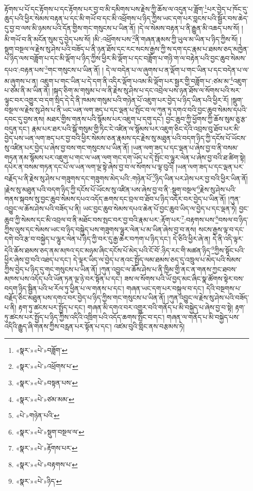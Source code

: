 རྟོགས་པ་པོ་དང་རྟོགས་པ་དང་རྟོགས་པར་བྱ་བ་མི་དམིགས་པས་རྗེས་ཀྱི་ཆོས་ལ་འདུན་པ་ཟློག་\footnote{«སྣར་»«པེ་»བཟློག་}པར་བྱེད་པ་ཁོང་དུ་ཆུད་པའི་ཕྱིར་སེམས་བརྟན་པ་དང་མི་གཡོ་བ་དང་མི་འཕྲོགས་པ་ཉིད་ཀྱིས་ཡང་དག་པར་བླངས་པའི་སྦྱོར་བས་ཆེད་དུ་བྱ་བ་ལས་མི་ཉམས་པའི་དོན་གྱིས་གང་གསུངས་པ་ཡིན་ནོ། །དེ་ལ་སེམས་བརྟན་པ་ནི་རྒྱུན་མི་འཆད་པས་སོ། །མི་གཡོ་བ་ནི་མངོན་སུམ་དུ་བྱེད་པས་སོ། །མི་:འཕྲོགས་པས་\footnote{«སྣར་»«པེ་»འཕྲོགས་པ་}ནི་གཞན་རྣམས་ཀྱི་ཡུལ་མ་ཡིན་པ་ཉིད་ཀྱིས་སོ། །སྡུག་བསྔལ་ལ་རྗེས་སུ་ཤེས་པའི་བཟོད་པ་ནི་ཉན་ཐོས་དང་རང་སངས་རྒྱས་ཀྱི་ས་དག་དང་རྣམ་པ་ཐམས་ཅད་མཁྱེན་པ་ཉིད་ལས་བཟློག་པ་དང་མི་ལྡོག་པ་ཉིད་ཀྱིས་ཕྱིར་མི་ལྡོག་པ་དང་བཟློག་པ་གཉི་ག་ལ་བརྟེན་པའི་བྱང་ཆུབ་སེམས་དཔའ་:བརྟན་པས་\footnote{«སྣར་»«པེ་»བསྟན་པས་}གང་གསུངས་པ་ཡིན་ནོ། །
དེ་ལ་བདེན་པ་ལ་ཞུགས་པ་ན་ལྡོག་པ་གང་ཡིན་པ་དང་བདེན་པ་ལ་མ་ཞུགས་པ་ན། འཇུག་པ་གང་ཡིན་པ་དེ་དག་ནི་འདིར་ལྡོག་པའམ་མི་ལྡོག་པར་སྦྱར་གྱི་བཟློག་པ་:ཙམ་མ་\footnote{«སྣར་»«པེ་»ཙམ་མམ་}འཇུག་པ་ཙམ་ནི་མ་ཡིན་ནོ། །སྐད་ཅིག་མ་གསུམ་པ་ལ་ནི་རྗེས་སུ་ཤེས་པ་དང་འབྲེལ་པས་ཉན་ཐོས་ལ་སོགས་པའི་སར་ལྟུང་བར་འགྱུར་བ་དག་སྲིད་དེ་དེ་ནི་ཁམས་གསུམ་པའི་གཉེན་པོ་འཇུག་པར་བྱེད་པ་ཉིད་ཡིན་པའི་ཕྱིར་རོ། །སྡུག་བསྔལ་ལ་རྗེས་སུ་ཤེས་པ་ནི་ཡང་ཡན་ལག་ཟད་པ་དང་ལྡན་པ་སྤོང་བ་ལ་ཀུན་ཏུ་དགའ་བའི་བྱང་ཆུབ་སེམས་དཔའི་དབང་དུ་བྱས་ནས། མཐར་གྱིས་གནས་པའི་སྙོམས་པར་འཇུག་པ་དགུ་དང་། བྱང་ཆུབ་ཀྱི་ཕྱོགས་ཀྱི་ཆོས་སུམ་ཅུ་རྩ་བདུན་དང་། རྣམ་པར་ཐར་པའི་སྒོ་གསུམ་གྱི་ཏིང་ངེ་འཛིན་ལ་སྙོམས་པར་འཇུག་ཅིང་དེའི་འབྲས་བུ་ཐོབ་པར་མི་བྱེད་པས་ཡན་ལག་ཟད་པར་བྱ་བའི་ཕྱིར་སེམས་ཅན་རྣམས་དང་རྗེས་སུ་མཐུན་པའི་བདག་ཉིད་ཀྱི་དངོས་པོ་ཡོངས་སུ་འཛིན་པར་བྱེད་པ་ཞེས་བྱ་བས་གང་གསུངས་པ་ཡིན་ནོ། །ཡན་ལག་ཟད་པ་དང་ལྡན་པ་ཞེས་བྱ་བ་ནི་བསམ་གཏན་ནམ་སྙོམས་པར་འཇུག་པ་གང་ལ་ཡན་ལག་གང་དག་ཡོད་པ་དེ་སྤོང་བ་ལྷུར་ལེན་པ་ཞེས་བྱ་བའི་ཐ་ཚིག་སྟེ། དཔེར་ན་བསམ་གཏན་དང་པོ་ལ་ཡན་ལག་ལྔ་སྟེ་ཞེས་བྱ་བ་ལ་སོགས་པ་ལྟ་བུའོ། །ཡན་ལག་ཟད་པ་དང་ལྡན་པར་བརྗོད་པ་ནི་རྗེས་སུ་ཤེས་པ་གཟུགས་དང་གཟུགས་མེད་པའི་:གཉེན་པོ་\footnote{«པེ་»གཉེན་པའི་}ཉིད་ཡིན་པར་ཤེས་པར་བྱ་བའི་ཕྱིར་ཡིན་ནོ། །རྗེས་སུ་མཐུན་པའི་བདག་ཉིད་ཀྱི་དངོས་པོ་ཡོངས་སུ་འཛིན་པས་ཞེས་བྱ་བ་ནི་:སྡུག་བསྔལ་\footnote{«སྣར་»«པེ་»སྡུག་བསྔལ་ལ་}རྗེས་སུ་ཤེས་པའི་གནས་སྐབས་སུ་བྱང་ཆུབ་སེམས་དཔའ་འདོད་ཆགས་དང་བྲལ་བ་ཐོབ་པ་ཉིད་འདོར་བར་བྱེད་པ་ཡིན་ནོ། །ཀུན་འབྱུང་ལ་ཆོས་ཤེས་པའི་བཟོད་པ་ནི། ཡང་བྱང་ཆུབ་སེམས་དཔའ་ཆེན་པོ་བྱང་ཆུབ་ཡིད་ལ་བྱེད་པ་དང་ལྡན་ཏེ། བྱང་ཆུབ་ཀྱི་སེམས་དང་མི་འབྲལ་བ་ནི་མཐོང་བས་སྤང་བར་བྱ་བའི་རྣམ་པར་:རྟོག་པར་\footnote{«སྣར་»«པེ་»རྟོགས་པར་}:བརྟགས་པས་\footnote{«སྣར་»«པེ་»བརྟགས་པ་}བསལ་བ་ཉིད་ཀྱིས་ལུས་དང་སེམས་ཡང་བ་ཉིད་བསྐྱེད་པས་གཟུགས་ལྷུར་ལེན་པ་མ་ཡིན་ཞེས་བྱ་བ་ནས། སངས་རྒྱས་ལྟ་བ་དང་དགེ་བའི་རྩ་བ་བསྐྱེད་པ་ལྷུར་ལེན་པ་ཉིད་ཀྱི་བར་དུ་རྒྱ་ཆེར་བཀག་པ་ཉིད་དང་། དེ་ཅིའི་ཕྱིར་ཞེ་ན། དེ་ནི་འདི་ལྟར་དེའི་ཆོས་ཐམས་ཅད་ནམ་མཁའ་དང་མཉམ་ཞིང་དངོས་པོ་མེད་པའི་ངོ་བོ་:ཉིད་རང་གི་མཚན་ཉིད་\footnote{«སྣར་»«པེ་»ཉིད་}ཀྱིས་སྟོང་པའི་ཕྱིར་ཞེས་བྱ་བའི་འཐད་པ་དང་། དེ་ལྟར་ཡིད་ལ་བྱེད་པ་ནའང་སྤྱོད་ལམ་ཐམས་ཅད་དུ་འཁྲུལ་པ་མེད་པའི་སེམས་ཀྱིས་བྱེད་པ་ཉིད་དུ་གང་གསུངས་པ་ཡིན་ནོ། །ཀུན་འབྱུང་ལ་ཆོས་ཤེས་པ་ནི་ཁྱིམ་གྱི་ནང་ན་གནས་ཀྱང་ཐབས་མཁས་པས་འདོད་པའི་ཡོན་ཏན་ལྔ་ཉེ་བར་སྟོན་པ་དང་། ཟས་ལ་སོགས་པའི་ཡོ་བྱད་མང་ཞིང་སྣ་ཚོགས་སྟེར་བས་བདག་ཉིད་སྦྱིན་པའི་ཕ་རོལ་ཏུ་ཕྱིན་པ་ལ་གནས་པ་དང་། གཞན་ཡང་དག་པར་བསྐུལ་བ་དང་། དེའི་བསྔགས་པ་བརྗོད་ཅིང་མཐུན་པས་དགའ་བར་བྱེད་པ་ཉིད་ཀྱིས་གང་གསུངས་པ་ཡིན་ནོ། །ཀུན་འབྱུང་ལ་རྗེས་སུ་ཤེས་པའི་བཟོད་པ་ནི། རྟག་ཏུ་ཚངས་པར་སྤྱོད་པ་དང་། གཞན་མི་དགའ་བར་འགྱུར་བའི་གནོད་པ་མི་བསྐྱེད་པ་ཞེས་བྱ་བ་སྟེ། རྟག་ཏུ་ཚངས་པར་སྤྱོད་པ་ཉིད་ཀྱིས་འདིའི་འཁྲིག་པའི་འདོད་ཆགས་སྤོང་བ་དང་། གཞན་ལ་གནོད་པ་མི་བསྐྱེད་པས་འདིའི་རྒྱུད་ཞི་གནས་ཀྱིས་བརླན་པར་སྟོན་པ་དང་། འཛམ་བུའི་གླིང་ནས་བརྩམས་ཏེ། 